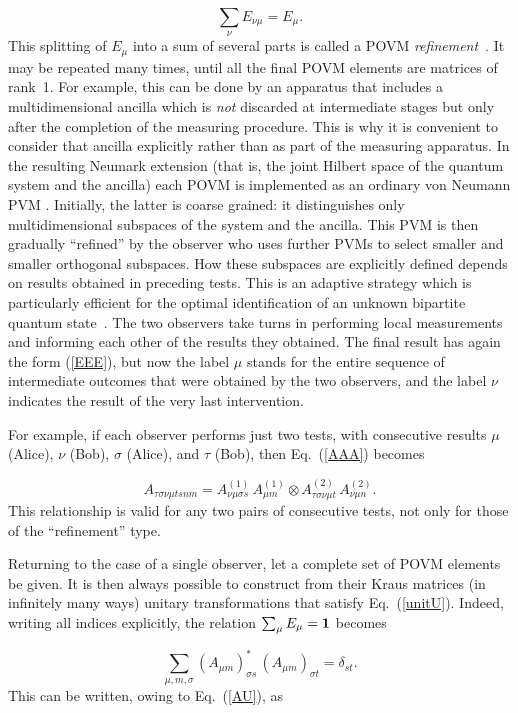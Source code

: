\documentclass[12pt]{article}
\def\beq{\begin{equation}}
\def\eeq{\end{equation}}
\def\Eq{Eq.~(\ref}
\def\0{\otimes}
\begin{document}
\beq \sum_\nu E_{\nu\mu}=E_\mu. \eeq
This splitting of $E_\mu$ into a sum of several parts is called a POVM
{\it refinement\/}~\cite{PW91}. It may be repeated many times, until all
the final POVM elements are matrices of rank~1. For example, this can be
done by an apparatus that includes a multidimensional ancilla which is
{\it not\/} discarded at intermediate stages but only after the
completion of the measuring procedure. This is why it is convenient to
consider that ancilla explicitly rather than as part of the measuring
apparatus. In the resulting Neumark extension (that is, the joint
Hilbert space of the quantum system and the ancilla) each POVM is
implemented as an ordinary von Neumann PVM \cite{Hel,Neu}. Initially,
the latter is coarse grained: it distinguishes only multidimensional
subspaces of the system and the ancilla. This PVM is then gradually
``refined'' by the observer who uses further PVMs to select smaller and
smaller orthogonal subspaces. How these subspaces are explicitly defined
depends on results obtained in preceding tests. This is an adaptive
strategy which is particularly efficient for the optimal identification
of an unknown bipartite quantum state~\cite{PW91}. The two observers
take turns in performing local measurements and informing each other of
the results they obtained. The final result has again the form
(\ref{EEE}), but now the label $\mu$ stands for the entire sequence of
intermediate outcomes that were obtained by the two observers, and the
label $\nu$ indicates the result of the very last intervention.

For example, if each observer performs just two tests, with consecutive
results $\mu$ (Alice), $\nu$ (Bob), $\sigma$ (Alice), and $\tau$ (Bob),
then \Eq{AAA}) becomes

\beq A_{\tau\sigma\nu\mu tsnm}=
 A^{(1)}_{\nu\mu\sigma s}\,A^{(1)}_{\mu m}\0
 A^{(2)}_{\tau\sigma\nu\mu t}\,A^{(2)}_{\nu\mu n}.\eeq
This relationship is valid for any two pairs of consecutive tests, not
only for those of the ``refinement'' type.

Returning to the case of a single observer, let a complete set of POVM
elements be given. It is then always possible to construct from their
Kraus matrices (in infinitely many ways) unitary transformations that
satisfy \Eq{unitU}). Indeed, writing all indices explicitly, the
relation $\sum_\mu E_\mu={\bf1}$ becomes

\beq \sum_{\mu,m,\sigma}
  (A_{\mu m})_{\sigma s}^*\,(A_{\mu m})_{\sigma t}=\delta_{st}.\eeq
This can be written, owing to \Eq{AU}), as
\end{document}
